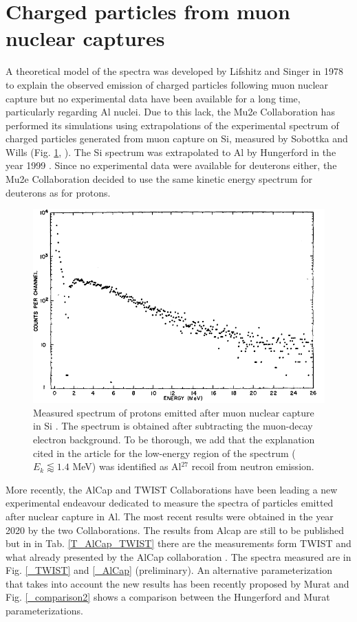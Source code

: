 \documentclass[12pt,a4paper,openright, oneside, titlepage]{book} %
\begin{document}
\section{Charged particles from muon nuclear captures}
A theoretical model of the spectra was developed by Lifshitz and Singer in 1978 \cite{Lifshitz} 
to explain the observed emission of charged particles following muon nuclear capture 
but no experimental data have been available for a long time, particularly regarding Al nuclei.
Due to this lack, the Mu2e Collaboration has performed its simulations using extrapolations of the experimental spectrum of charged particles generated from muon capture on Si, measured by Sobottka and Wills (Fig. \ref{_sobottka}, \cite{Sobottka}).
The Si spectrum was extrapolated to Al by Hungerford in the year 1999 \cite{Hungerford}.
Since no experimental data were available for deuterons either, the Mu2e Collaboration decided to use the same kinetic energy spectrum for deuterons as for protons.

\begin{figure}[!htb]
\centering
\includegraphics[scale=0.8]{sobottka}
\caption[Proton spectrum from nuclear capture in Si]{Measured spectrum of protons emitted after muon nuclear capture in Si \cite{Sobottka}. 
The spectrum is obtained after subtracting the muon-decay electron background.
To be thorough, we add that the explanation cited in the article for the low-energy region of the spectrum ($E_k\lessapprox1.4$ MeV) was identified as Al$^{27}$ recoil from neutron emission. }
\label{_sobottka}
\end{figure}

\noindent 
More recently, the AlCap \cite{AlCap:2018} and TWIST \cite{TWIST:2020} Collaborations 
have been leading a new experimental endeavour dedicated to measure the spectra 
of particles emitted after nuclear capture in Al. 
The most recent results were obtained in the year 2020 by the two Collaborations. The results from Alcap are still to be published but in in Tab. \ref{T_AlCap_TWIST} there are the measurements form TWIST and what already presented by the AlCap collaboration \cite{AlCap:2020}. The spectra measured are in Fig. \ref{_TWIST} and \ref{_AlCap} (preliminary). 
An alternative parameterization that takes into account the new results has been recently proposed by Murat \cite{Pasha:spectra} and Fig. \ref{_comparison2} \cite{io:comparison} shows a comparison between the Hungerford and Murat parameterizations.
\end{document}
